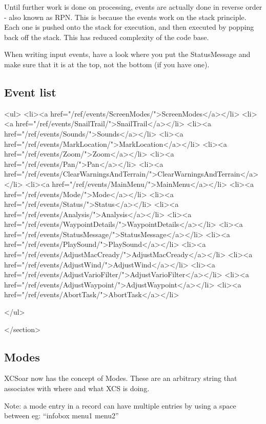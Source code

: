 Until further work is done on processing, events are actually done in
reverse order - also known as RPN. This is because the events work on
the stack principle. Each one is pushed onto the stack for execution,
and then executed by popping back off the stack. This has reduced
complexity of the code base.

When writing input events, have a look where you put the StatusMessage
and make sure that it is at the top, not the bottom (if you have one).

\subsection{Event list}

				<ul>
					<li><a href="/ref/events/ScreenModes/">ScreenModes</a></li>
					<li><a href="/ref/events/SnailTrail/">SnailTrail</a></li>
					<li><a href="/ref/events/Sounds/">Sounds</a></li>
					<li><a href="/ref/events/MarkLocation/">MarkLocation</a></li>
					<li><a href="/ref/events/Zoom/">Zoom</a></li>
					<li><a href="/ref/events/Pan/">Pan</a></li>
					<li><a href="/ref/events/ClearWarningsAndTerrain/">ClearWarningsAndTerrain</a></li>
					<li><a href="/ref/events/MainMenu/">MainMenu</a></li>
					<li><a href="/ref/events/Mode/">Mode</a></li>
					<li><a href="/ref/events/Status/">Status</a></li>
					<li><a href="/ref/events/Analysis/">Analysis</a></li>
					<li><a href="/ref/events/WaypointDetails/">WaypointDetails</a></li>
					<li><a href="/ref/events/StatusMessage/">StatusMessage</a></li>
					<li><a href="/ref/events/PlaySound/">PlaySound</a></li>
					<li><a href="/ref/events/AdjustMacCready/">AdjustMacCready</a></li>
					<li><a href="/ref/events/AdjustWind/">AdjustWind</a></li>
					<li><a href="/ref/events/AdjustVarioFilter/">AdjustVarioFilter</a></li>
					<li><a href="/ref/events/AdjustWaypoint/">AdjustWaypoint</a></li>
					<li><a href="/ref/events/AbortTask/">AbortTask</a></li>

				</ul>

			</section>

\subsection{Modes}

XCSoar now has the concept of Modes. These are an arbitrary
string that associates with where and what XCS is doing.

Note: a mode entry in a record can have multiple entries by using a space
between eg: ``infobox menu1 menu2''


